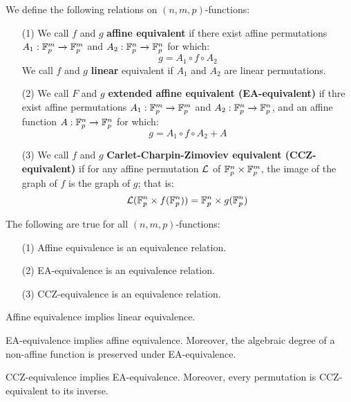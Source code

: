 \begin{definition}
  We define the following relations on $(n,m,p)$-functions:
  \begin{enumerate}
    \item[(1)] We call $f$ and $g$ \textbf{affine equivalent} if
      there exist affine permutations $A_1:\mathbb{F}_p^m \xrightarrow{}
      \mathbb{F}_p^m$ and $A_2:\mathbb{F}_p^n \xrightarrow{} \mathbb{F}_p^n$ for which:
      \begin{equation*}
        g=A_1 \circ f \circ A_2
      \end{equation*}
      We call $f$ and $g$ \textbf{linear} equivalent if $A_1$ and
      $A_2$ are linear permutations.

    \item[(2)] We call $F$ and $g$ \textbf{extended affine equivalent
      (EA-equivalent)} if thre exist affine permutations $A_1:\mathbb{F}_p^m
      \xrightarrow{} \mathbb{F}_p^m$ and $A_2:\mathbb{F}_p^n \xrightarrow{} \mathbb{F}_p^n$,
      and an affine function $A:\mathbb{F}_p^n \xrightarrow{} \mathbb{F}_p^n$ for
      which:
      \begin{equation*}
        g=A_1 \circ f \circ A_2+A
      \end{equation*}

    \item[(3)] We call $f$ and $g$ \textbf{Carlet-Charpin-Zimoviev
        equivalent (CCZ-equivalent)} if for any affine permutation
        $\mathcal{L}$ of  $\mathbb{F}_p^n \times \mathbb{F}_p^m$, the image of the graph of
        $f$ is the graph of $g$; that is:
        \begin{equation*}
          \mathcal{L}(\mathbb{F}_p^n \times f(\mathbb{F}_p^n))=\mathbb{F}_p^n \times g(\mathbb{F}_p^n)
        \end{equation*}
  \end{enumerate}
\end{definition}

\begin{proposition}\label{proposition_1.1.5}
  The following are true for all $(n,m,p)$-functions:
  \begin{enumerate}
    \item[(1)] Affine equivalence is an equivalence relation.

    \item[(2)] EA-equivalence is an equivalence relation.

    \item[(3)] CCZ-equivalence is an equivalence relation.
  \end{enumerate}
\end{proposition}
\begin{corollary}
  Affine equivalence implies linear equivalence.
\end{corollary}
\begin{corollary}
  EA-equivalence implies affine equivalence. Moreover, the algebraic
  degree of a non-affine function is preserved under EA-equivalence.
\end{corollary}
\begin{corollary}
  CCZ-equivalence implies EA-equivalence. Moreover, every permutation
  is CCZ-equivalent to its inverse.
\end{corollary}

